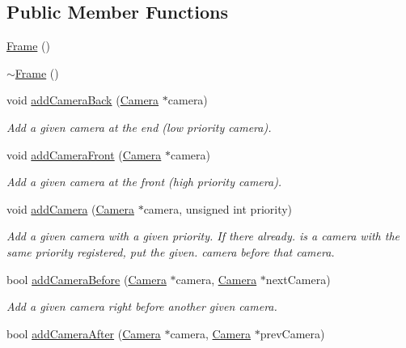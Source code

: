 \subsection*{Public Member Functions}
\begin{DoxyCompactItemize}
\item 
\mbox{\hyperlink{classec_1_1_frame_a80ed1da85818f646b6b80fb6c8a6c2a6}{Frame}} ()
\item 
\mbox{\hyperlink{classec_1_1_frame_af2b2c733cacb47d99e460a2b75667eaa}{$\sim$\+Frame}} ()
\item 
void \mbox{\hyperlink{classec_1_1_frame_a1cfcb26e088e6f6b07103af8ac9d3bfa}{add\+Camera\+Back}} (\mbox{\hyperlink{classec_1_1_camera}{Camera}} $\ast$camera)
\begin{DoxyCompactList}\small\item\em Add a given camera at the end (low priority camera). \end{DoxyCompactList}\item 
void \mbox{\hyperlink{classec_1_1_frame_abcbaa8a587c8ad75173aacaa853bc5b2}{add\+Camera\+Front}} (\mbox{\hyperlink{classec_1_1_camera}{Camera}} $\ast$camera)
\begin{DoxyCompactList}\small\item\em Add a given camera at the front (high priority camera). \end{DoxyCompactList}\item 
void \mbox{\hyperlink{classec_1_1_frame_a04ba39407bc0f6e78fe47f37b3f19131}{add\+Camera}} (\mbox{\hyperlink{classec_1_1_camera}{Camera}} $\ast$camera, unsigned int priority)
\begin{DoxyCompactList}\small\item\em Add a given camera with a given priority. If there already. is a camera with the same priority registered, put the given. camera before that camera. \end{DoxyCompactList}\item 
bool \mbox{\hyperlink{classec_1_1_frame_af1f1769a61f70a756fd762d80a676063}{add\+Camera\+Before}} (\mbox{\hyperlink{classec_1_1_camera}{Camera}} $\ast$camera, \mbox{\hyperlink{classec_1_1_camera}{Camera}} $\ast$next\+Camera)
\begin{DoxyCompactList}\small\item\em Add a given camera right before another given camera. \end{DoxyCompactList}\item 
bool \mbox{\hyperlink{classec_1_1_frame_a60b34025921413dd3ea92c9146d76825}{add\+Camera\+After}} (\mbox{\hyperlink{classec_1_1_camera}{Camera}} $\ast$camera, \mbox{\hyperlink{classec_1_1_camera}{Camera}} $\ast$prev\+Camera)

\end{DoxyCompactItemize}
